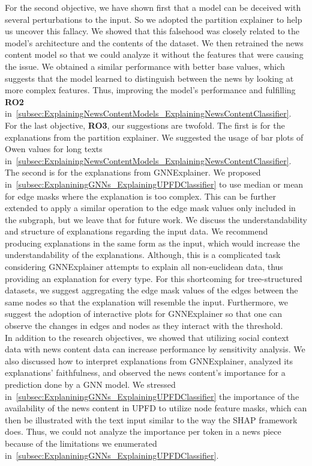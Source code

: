 For the second objective, we have shown first that a model can be deceived with several perturbations to the input. So we adopted the partition explainer to help us uncover this fallacy. We showed that this falsehood was closely related to the  model's architecture and the contents of the dataset. We then retrained the news content model so that we could analyze it without the features that were causing the issue. We obtained a similar performance with better base values, which suggests that the model learned to distinguish between the news by looking at more complex features. Thus, improving the model's performance and fulfilling \textbf{RO2} in~\ref{subsec:ExplainingNewsContentModels_ExplainingNewsContentClassifier}.\\
For the last objective, \textbf{RO3}, our suggestions are twofold. The first is for the explanations from the partition explainer. We suggested the usage of bar plots of Owen values for long texts in~\ref{subsec:ExplainingNewsContentModels_ExplainingNewsContentClassifier}. The second is for the explanations from GNNExplainer. We proposed in~\ref{subsec:ExplaniningGNNs_ExplainingUPFDClassifier} to use median or mean for edge masks where the explanation is too complex. This can be further extended to apply a similar operation to the edge mask values only included in the subgraph, but we leave that for future work. We discuss the understandability and structure of explanations regarding the input data. We recommend producing explanations in the same form as the input, which would increase the understandability of the explanations. Although, this is a complicated task considering GNNExplainer attempts to explain all non-euclidean data, thus providing an explanation for every type. For this shortcoming for tree-structured datasets, we suggest aggregating the edge mask values of the edges between the same nodes so that the explanation will resemble the input. Furthermore, we suggest the adoption of interactive plots for GNNExplainer so that one can observe the changes in edges and nodes as they interact with the threshold.\\
In addition to the research objectives, we showed that utilizing social context data with news content data can increase performance by sensitivity analysis. We also discussed how to interpret explanations from GNNExplainer, analyzed its explanations' faithfulness, and observed the news content's importance for a prediction done by a GNN model. We stressed in~\ref{subsec:ExplaniningGNNs_ExplainingUPFDClassifier} the importance of the availability of the news content in UPFD to utilize node feature masks, which can then be illustrated with the text input similar to the way the SHAP framework does. Thus, we could not analyze the importance per token in a news piece because of the limitations we enumerated in~\ref{subsec:ExplaniningGNNs_ExplainingUPFDClassifier}.\\
